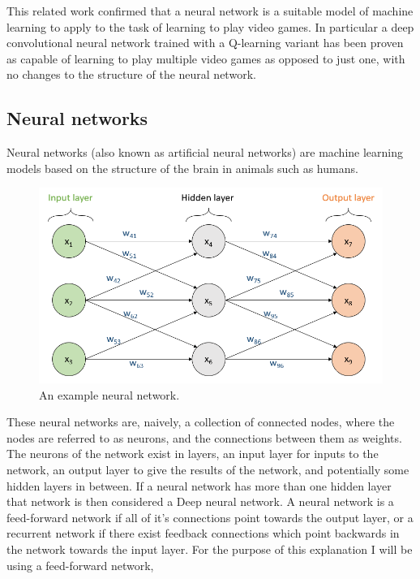 \documentclass[10pt]{article}
\begin{document}
		This related work confirmed that a neural network is a suitable model of machine learning to apply to the task of learning to play video games. In particular a deep convolutional neural network trained with a Q-learning variant has been proven as capable of learning to play multiple video games as opposed to just one, with no changes to the structure of the neural network.\\
		
	\medskip
	\subsection{Neural networks}
		Neural networks (also known as artificial neural networks) are machine learning models based on the structure of the brain in animals such as humans.\\
		
		\begin{figure}[h]			
			\includegraphics[scale=0.5]{img/network}
			\centering
			\caption{An example neural network.}
			\label{nnetwork}
		\end{figure}	
		
		These neural networks are, naively, a collection of connected nodes, where the nodes are referred to as neurons, and the connections between them as weights. The neurons of the network exist in layers, an input layer for inputs to the network, an output layer to give the results of the network, and potentially some hidden layers in between. If a neural network has more than one hidden layer that network is then considered a Deep neural network. A neural network is a feed-forward network if all of it's connections point towards the output layer, or a recurrent network if there exist feedback connections which point backwards in the network towards the input layer. For the purpose of this explanation I will be using a feed-forward network,\\
		
\end{document}
